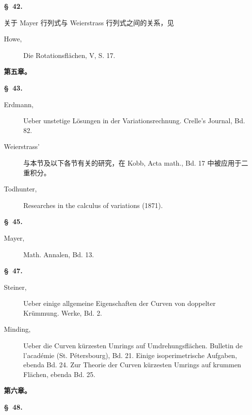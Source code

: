 \documentclass[11pt,a4paper,leqno]{article}
\begin{document}
\begin{center}{\bfseries \S~42.}\end{center}

\noindent 关于 Mayer 行列式与 Weierstrass 行列式之间的关系，见

\begin{description}
\item[Howe,] Die Rotationsflächen, V, S. 17.
\end{description}

\begin{center}
{\large\bfseries 第五章。}

{\bfseries \S~43.}
\end{center}

\begin{description}
\item[Erdmann,] Ueber unstetige Lösungen in der Variationsrechnung. Crelle's
Journal, Bd. 82.

\item[Weierstrass'] 与本节及以下各节有关的研究，在 Kobb, Acta math., Bd. 17
中被应用于二重积分。

\item[Todhunter,] Researches in the calculus of variations (1871).
\end{description}

\begin{center}{\bfseries \S~45.}\end{center}

\begin{description}
\item[Mayer,] Math. Annalen, Bd. 13.
\end{description}

\begin{center}{\bfseries \S~47.}\end{center}

\begin{description}
\item[Steiner,] Ueber einige allgemeine Eigenschaften der Curven von doppelter
Krümmung. Werke, Bd. 2.

\item[Minding,] Ueber die Curven kürzesten Umrings auf Umdrehungsflächen.
Bulletin de l'académie (St. Pétersbourg), Bd. 21. Einige isoperimetrische
Aufgaben, ebenda Bd. 24. Zur Theorie der Curven kürzesten Umrings auf krummen
Flächen, ebenda Bd. 25.
\end{description}

\begin{center}
{\large\bfseries 第六章。}

{\bfseries \S~48.}
\end{center}
\end{document}
